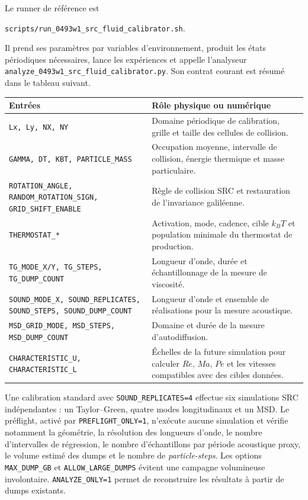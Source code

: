 \documentclass[11pt,a4paper]{article}
\begin{document}
Le runner de référence est
\begin{center}
  \texttt{scripts/run\_0493w1\_src\_fluid\_calibrator.sh}.
\end{center}
Il prend ses paramètres par variables d'environnement, produit les états périodiques nécessaires, lance les expériences et appelle l'analyseur \texttt{analyze\_0493w1\_src\_fluid\_calibrator.py}. Son contrat courant est résumé dans le tableau suivant.

\begin{center}
\small
\begin{tabular}{p{}p{}}
\toprule
Entrées & Rôle physique ou numérique \\
\midrule
\texttt{Lx, Ly, NX, NY} & Domaine périodique de calibration, grille et taille des cellules de collision. \\
\texttt{GAMMA, DT, KBT, PARTICLE\_MASS} & Occupation moyenne, intervalle de collision, énergie thermique et masse particulaire. \\
\texttt{ROTATION\_ANGLE, RANDOM\_ROTATION\_SIGN, GRID\_SHIFT\_ENABLE} & Règle de collision SRC et restauration de l'invariance galiléenne. \\
\texttt{THERMOSTAT\_*} & Activation, mode, cadence, cible $k_BT$ et population minimale du thermostat de production. \\
\texttt{TG\_MODE\_X/Y, TG\_STEPS, TG\_DUMP\_COUNT} & Longueur d'onde, durée et échantillonnage de la mesure de viscosité. \\
\texttt{SOUND\_MODE\_X, SOUND\_REPLICATES, SOUND\_STEPS, SOUND\_DUMP\_COUNT} & Longueur d'onde et ensemble de réalisations pour la mesure acoustique. \\
\texttt{MSD\_GRID\_MODE, MSD\_STEPS, MSD\_DUMP\_COUNT} & Domaine et durée de la mesure d'autodiffusion. \\
\texttt{CHARACTERISTIC\_U, CHARACTERISTIC\_L} & Échelles de la future simulation pour calculer $Re$, $Ma$, $Pe$ et les vitesses compatibles avec des cibles données. \\
\bottomrule
\end{tabular}
\end{center}

Une calibration standard avec \texttt{SOUND\_REPLICATES=4} effectue six simulations SRC indépendantes : un Taylor--Green, quatre modes longitudinaux et un MSD. Le préflight, activé par \texttt{PREFLIGHT\_ONLY=1}, n'exécute aucune simulation et vérifie notamment la géométrie, la résolution des longueurs d'onde, le nombre d'intervalles de régression, le nombre d'échantillons par période acoustique proxy, le volume estimé des dumps et le nombre de \emph{particle-steps}. Les options \texttt{MAX\_DUMP\_GB} et \texttt{ALLOW\_LARGE\_DUMPS} évitent une campagne volumineuse involontaire. \texttt{ANALYZE\_ONLY=1} permet de reconstruire les résultats à partir de dumps existants.
\end{document}
